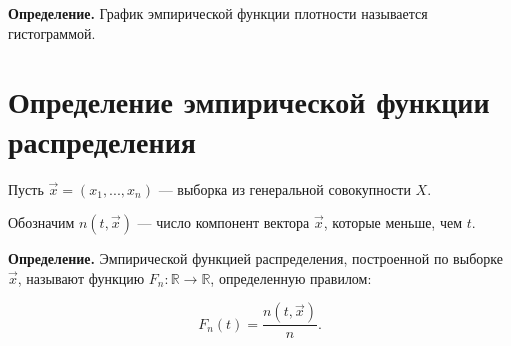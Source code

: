 \textbf{Определение.} График эмпирической функции плотности называется
гистограммой.

\section{Определение эмпирической функции распределения}

Пусть $\vec{x} = (x_1, ..., x_n)$ --- выборка из генеральной совокупности $X$.

Обозначим $n(t, \vec{x})$ --- число компонент вектора $\vec{x}$, которые меньше,
чем $t$.

\textbf{Определение.} Эмпирической функцией распределения, построенной по
выборке $\vec{x}$, называют функцию $F_n: \mathbb{R} \to \mathbb{R}$,
определенную правилом: 

\begin{equation}
    F_n(t) = \frac{n(t, \vec x)}{n}.
\end{equation}
